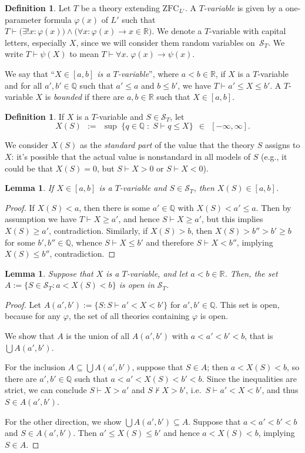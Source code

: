 \documentclass[12pt]{article}
\newcommand{\vp}{\varphi}
\newcommand{\RR}{\mathbb{R}}
\newcommand{\QQ}{\mathbb{Q}}
\newcommand{\zfc}{\mathrm{ZFC}}
\newcommand{\zfcl}{{\zfc_{\cL}}}
\newcommand{\cL}{L'}
\newcommand{\cS}{\mathcal{S}}
\newcommand{\inClosed}[1]{#1 \in [a, b]}
\newcommand{\Tvar}{$T$-variable}
\theoremstyle{plain}
\newtheorem{lemma}[theorem]{Lemma}
\theoremstyle{definition}
\newtheorem{definition}[theorem]{Definition}
\theoremstyle{remark}
\begin{document}
\begin{definition}
Let $T$ be a theory extending $\zfcl$. 
A \emph{\Tvar{}}
is given by a one-parameter formula $\vp(x)$ of $\cL$ such that $T\vdash\big(\exists!x:\vp(x)\big)\wedge\big(\forall x:\vp(x)\to x\in\RR\big)$. 
We denote a \Tvar{} with capital letters, especially $X$, since we will consider them random variables on~$\cS_T$.
We write $T\vdash\psi(X)$ to mean $T\vdash\forall x.\;\vp(x)\to\psi(x)$.

We say that ``\emph{$X\in[a,b]$ is a \Tvar{}}'', where $a<b\in\RR$, if $X$ is a \Tvar{} and for all $a',b'\in\QQ$ such that $a'\le a$ and $b\le b'$, we have $T\vdash a'\le X\le b'$.
A \Tvar{} $X$ is \emph{bounded} if there are $a,b\in\RR$ such that $\inClosed{X}$.
\end{definition}
\begin{definition}
If $X$ is a \Tvar{} and $S\in\cS_T$, let
\[X(S) \;\,:=\;\, \sup\;\{q\in\QQ \;:\; S\vdash  q \le X\} \;\,\in\;\, [-\infty,\infty].\]
\end{definition}
We consider $X(S)$ as the \emph{standard part} of the value that the theory $S$ assigns to $X$: it's possible that the actual value is nonstandard in all models of $S$ (e.g., it could be that $X(S) = 0$, but $S\vdash X>0$ or $S\vdash X<0$).
\begin{lemma}
If $X\in[a,b]$ is a \Tvar{} and $S\in\cS_T$, then $X(S)\in[a,b]$.
\end{lemma}
\begin{proof}
If $X(S) < a$, then there is some $a'\in\QQ$ with $X(S) < a' \le a$. 
Then by assumption we have $T\vdash X\geq a'$, and hence $S\vdash X\geq a'$, but this implies $X(S)\ge a'$, contradiction.
Similarly, if $X(S) > b$, then $X(S) > b'' > b' \ge b$ for some $b',b''\in\QQ$, whence $S\vdash X\le b'$ and therefore $S\vdash X< b''$, implying $X(S) \le b''$, contradiction.
\end{proof}
\begin{lemma}
Suppose that $X$ is a \Tvar{}, and let $a<b\in\RR$. Then, the set $A := \{S\in\cS_T : a< X(S)<b\}$ is open in $\cS_T$.
\end{lemma}
\begin{proof}
Let $A(a',b') := \{S : S\vdash a' < X <  b'\}$ for $a',b'\in\QQ$. 
This set is open, because for any $\vp$, the set of all theories containing $\vp$ is open. 

We show that $A$ is the union of all $A(a',b')$ with $a < a' < b' < b$, that is $\bigcup A(a',b')$.

For the inclusion $A \subseteq \bigcup A(a',b')$, suppose that $S\in A$; then $a < X(S) < b$, so there are $a',b'\in\QQ$ such that $a<a'<X(S)<b'<b$.
Since the inequalities are strict, we can conclude $S\vdash X >  a'$ and $S\nvdash X >  b'$, i.e.\ $S\vdash a' < X <  b'$, and thus $S\in A(a',b')$.

For the other direction, we show $\bigcup A(a',b')\subseteq A$. 
Suppose that $a < a' < b' < b$ and $S\in A(a',b')$.
Then $a' \le X(S) \le b'$ and hence $a < X(S) < b$, implying $S\in A$.
\end{proof}
\end{document}
